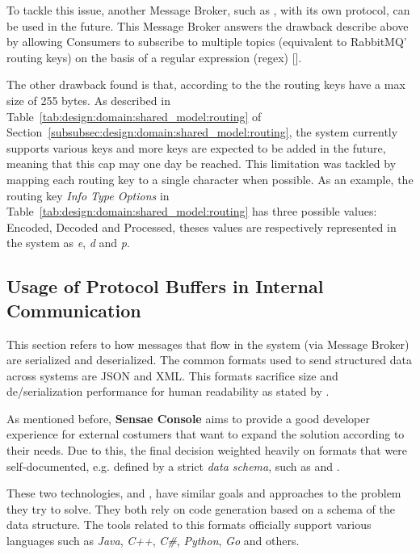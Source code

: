 To tackle this issue, another Message Broker, such as , with its own protocol, can be used in the future. This Message Broker answers the drawback describe above by allowing Consumers to subscribe to multiple topics (equivalent to RabbitMQ' routing keys) on the basis of a regular expression (regex) [].

The other drawback found is that, according to the  the routing keys have a max size of 255 bytes. As described in Table~\ref{tab:design:domain:shared_model:routing} of Section~\ref{subsubsec:design:domain:shared_model:routing}, the system currently supports various keys and more keys are expected to be added in the future, meaning that this cap may one day be reached. This limitation was tackled by mapping each routing key to a single character when possible. As an example, the routing key \textit{Info Type Options} in Table~\ref{tab:design:domain:shared_model:routing} has three possible values: Encoded, Decoded and Processed, theses values are respectively represented in the system as \textit{e}, \textit{d} and \textit{p}.

\subsection{Usage of Protocol Buffers in Internal Communication}
\label{subsec:implementation:decisions:proto}

This section refers to how messages that flow in the system (via Message Broker) are serialized and deserialized. The common formats used to send structured data across systems are \gls{JSON} and \gls{XML}. This formats sacrifice size and de/serialization performance for human readability as stated by \cite{sumaray2012comparison}.

As mentioned before, \textbf{Sensae Console} aims to provide a good developer experience for external costumers that want to expand the solution according to their needs. Due to this, the final decision weighted heavily on formats that were self-documented, e.g. defined by a strict \textit{data schema}, such as  and .

These two technologies,  and , have similar goals and approaches to the problem they try to solve. They both rely on code generation based on a schema of the data structure. The tools related to this formats officially support various languages such as \textit{Java}, \textit{C++}, \textit{C\#}, \textit{Python}, \textit{Go} and others.

